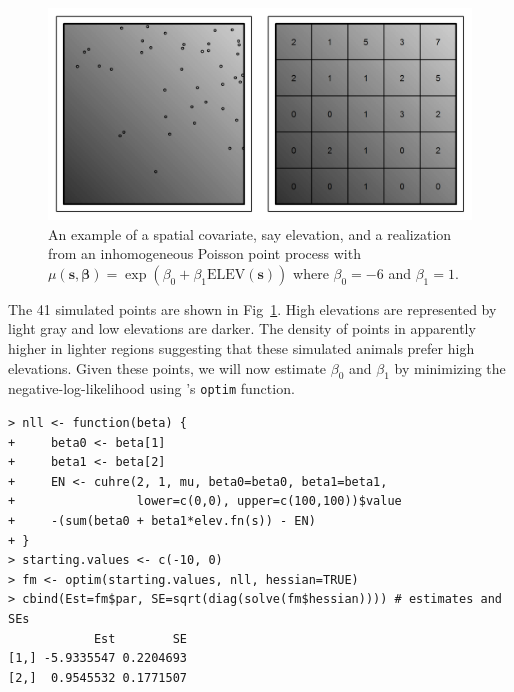 \begin{figure}%
\centering
\includegraphics[width=\textwidth]{Ch11-Statespace/figs/heteroPlots}
\caption{An example of a spatial covariate, say elevation, and a
  realization from an inhomogeneous Poisson point process with
  $\mu(\mathbf{s}, \bm{\beta}) = \exp(\beta_0 + \beta_1
  \mbox{ELEV}(\mathbf{s}))$ where $\beta_0=-6$ and $\beta_1=1$.}
\label{state-space.fig.hetero}
\end{figure}

The 41 simulated points are shown in
Fig~\ref{state-space.fig.hetero}. High elevations
are represented by light gray and low elevations are darker. The
density of points in apparently higher in lighter regions
suggesting that these simulated animals prefer high
elevations.  %
Given these points, we will now estimate $\beta_0$ and $\beta_1$ by
minimizing the negative-log-likelihood using \R's \verb+optim+
function.

\begin{small}
\begin{verbatim}
> nll <- function(beta) {
+     beta0 <- beta[1]
+     beta1 <- beta[2]
+     EN <- cuhre(2, 1, mu, beta0=beta0, beta1=beta1,
+                 lower=c(0,0), upper=c(100,100))$value
+     -(sum(beta0 + beta1*elev.fn(s)) - EN)
+ }
> starting.values <- c(-10, 0)
> fm <- optim(starting.values, nll, hessian=TRUE)
> cbind(Est=fm$par, SE=sqrt(diag(solve(fm$hessian)))) # estimates and SEs
            Est        SE
[1,] -5.9335547 0.2204693
[2,]  0.9545532 0.1771507
\end{verbatim}
\end{small}

